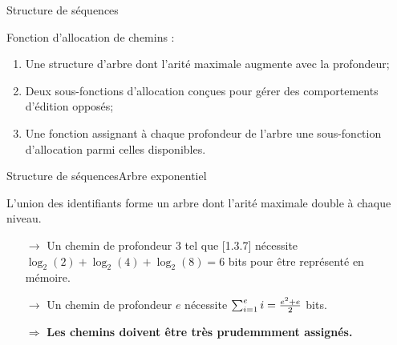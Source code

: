 \begin{frame}{Structure de séquences}{\LSEQ}
  
  Fonction d'allocation de chemins :
  \begin{enumerate}
  \item Une structure d'arbre dont l'arité maximale augmente avec la profondeur;
  \item Deux sous-fonctions d'allocation conçues pour gérer des comportements
    d'édition opposés;
  \item Une fonction assignant à chaque profondeur de l'arbre une sous-fonction
    d'allocation parmi celles disponibles.
  \end{enumerate}
  
\end{frame}


\begin{frame}{Structure de séquences}{Arbre exponentiel}

  \begin{center}
    
  \end{center}

  L'union des identifiants forme un arbre dont l'arité maximale double à chaque
  niveau.
  
  \begin{itemize}
  \item [$\rightarrow$] Un chemin de profondeur 3 tel que [1.3.7] nécessite
    $\log_2(2)+\log_2(4)+\log_2(8)=6$ bits pour être représenté en mémoire.
  \item [$\rightarrow$] Un chemin de profondeur $e$ nécessite
    $\sum_{i=1}^e i = {e^2 + e \over 2}$ bits.
  \end{itemize}

  \vspace{0.25cm}
  \large
  \begin{itemize}
  \item [$\Rightarrow$] \textbf{Les chemins doivent être très prudemmment assignés.}
  \end{itemize}
    

\end{frame}


